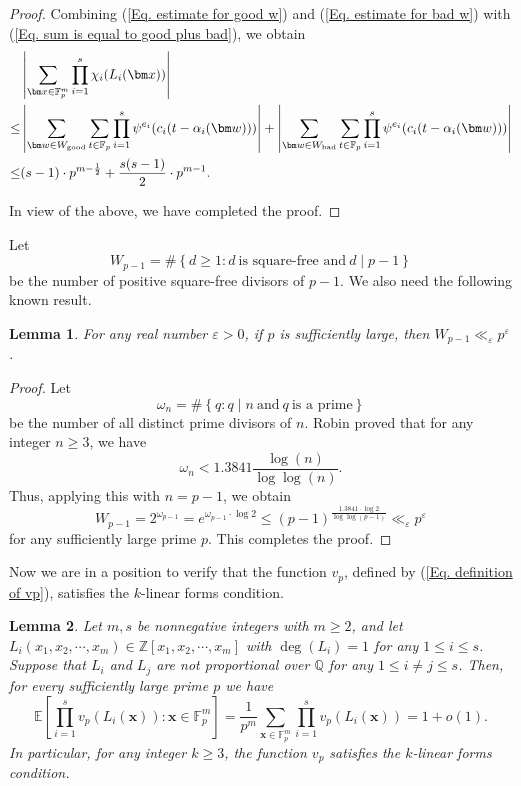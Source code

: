 \documentclass[12pt]{amsart}
\def\w{{\bm w}}
\def\x{{\bm x}}
\def\bad{{\rm bad}}
\def\good{{\rm good}}
\theoremstyle{plain}
\newtheorem{lemma}{Lemma}
\theoremstyle{remark}
\begin{document}
\begin{proof}
Combining (\ref{Eq. estimate for good w}) and (\ref{Eq. estimate for bad w}) with (\ref{Eq. sum is equal to good plus bad}), we obtain 
\begin{align*}
	 &\left|\sum_{\x\in\mathbb{F}_p^m}\prod_{i=1}^{s}\chi_i(L_i(\x))\right|\\
\le &\left|\sum_{\w\in W_{\good}}\sum_{t\in\mathbb{F}_p}\prod_{i=1}^{s}\psi^{e_i}(c_i(t-\alpha_i(\w)))\right|+\left|\sum_{\w\in W_{\bad}}\sum_{t\in\mathbb{F}_p}\prod_{i=1}^{s}\psi^{e_i}(c_i(t-\alpha_i(\w)))\right|\\
\le & (s-1)\cdot p^{m-\frac{1}{2}}+\frac{s(s-1)}{2}\cdot p^{m-1}.
\end{align*}
		
In view of the above, we have completed the proof. 
	\end{proof}
	
	Let 
	$$W_{p-1}=\#\left\{d\ge 1: d\ \text{is square-free and}\ d\mid p-1\right\}$$
	be the number of positive square-free divisors of $p-1$. We also need the following known result. 
	\begin{lemma}\label{Lem. W p-1 is very small}
		For any real number $\varepsilon>0$, if $p$ is sufficiently large, then $W_{p-1}\ll_{\varepsilon}p^{\varepsilon}$. 
	\end{lemma}
	
	\begin{proof}
     Let 
$$\omega_{n}=\#\left\{q: q\mid n\ \text{and}\ q\ \text{is a prime}\right\}$$
     be the number of all distinct prime divisors of $n$. Robin \cite[Theorem 11]{Robin} proved that for any integer $n\ge 3$, we have 
     	$$\omega_{n}<1.3841\frac{\log (n)}{\log\log (n)}.$$
     	Thus, applying this with $n=p-1$, we obtain
     	$$W_{p-1}=2^{\omega_{p-1}}=e^{\omega_{p-1}\cdot \log 2}\le (p-1)^{\frac{1.3841\cdot\log 2}{\log\log(p-1)}}\ll_{\varepsilon}p^{\varepsilon}$$
     	for any sufficiently large prime $p$. This completes the proof. 
	\end{proof}
	
	
	
	Now we are in a position to verify that the function $v_p$, defined by (\ref{Eq. definition of vp}), satisfies the $k$-linear forms condition. 
	
	\begin{lemma}\label{Lem. vp satisfies the k linear forms condition}
			Let $m,s$ be nonnegative integers with $m\ge2$, and let $L_i(x_1,x_2,\cdots,x_m)\in\mathbb{Z}[x_1,x_2,\cdots,x_m]$ with $\deg(L_i)=1$ for any $1\le i\le s$. Suppose  that $L_i$ and $L_j$ are not proportional over $\mathbb{Q}$ for any $1\le i\neq j\le s$. Then, for every sufficiently large prime $p$ we have 
			$$\mathbb{E}\left[\prod_{i=1}^{s}v_p(L_i(\x)): \x\in\mathbb{F}_p^m\right]=\frac{1}{p^m}\sum_{\x\in\mathbb{F}_p^m}\prod_{i=1}^{s}v_p(L_i(\x))=1+o(1).$$
		   In particular, for any integer $k\ge3$, the function $v_p$ satisfies the $k$-linear forms condition. 
	\end{lemma}
	
\end{document}
